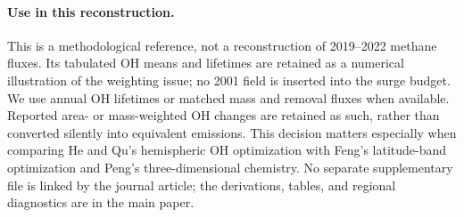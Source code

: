 \documentclass[11pt]{article}
\begin{document}
\paragraph{Use in this reconstruction.} This is a methodological reference,
not a reconstruction of 2019--2022 methane fluxes. Its tabulated OH means and
lifetimes are retained as a numerical illustration of the weighting issue;
no 2001 field is inserted into the surge budget. We use annual OH lifetimes or
matched mass and removal fluxes when available. Reported area- or mass-weighted
OH changes are retained as such, rather than converted silently into equivalent
emissions. This decision matters especially when comparing He and Qu's
hemispheric OH optimization with Feng's latitude-band optimization and Peng's
three-dimensional chemistry. No separate supplementary file is linked by the
journal article; the derivations, tables, and regional diagnostics are in the
main paper.
\end{document}
